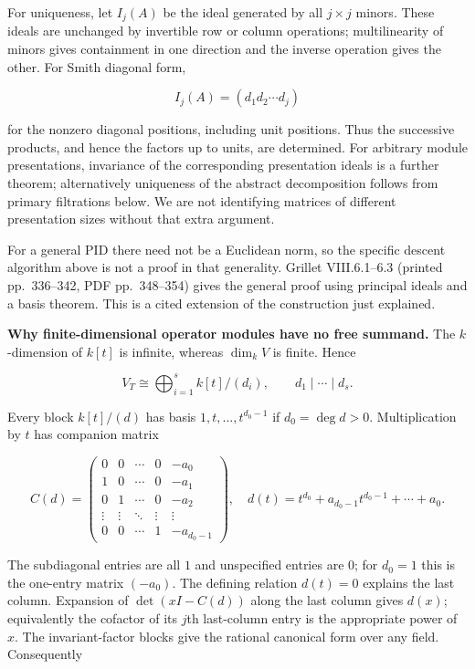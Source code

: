 \documentclass[
  11pt,
]{article}
\begin{document}
For uniqueness, let \(I_j(A)\) be the ideal generated by all
\(j\times j\) minors. These ideals are unchanged by invertible row or
column operations; multilinearity of minors gives containment in one
direction and the inverse operation gives the other. For Smith diagonal
form,

\[I_j(A)=(d_1d_2\cdots d_j)\]

for the nonzero diagonal positions, including unit positions. Thus the
successive products, and hence the factors up to units, are determined.
For arbitrary module presentations, invariance of the corresponding
presentation ideals is a further theorem; alternatively uniqueness of
the abstract decomposition follows from primary filtrations below. We
are not identifying matrices of different presentation sizes without
that extra argument.

For a general PID there need not be a Euclidean norm, so the specific
descent algorithm above is not a proof in that generality. Grillet
VIII.6.1--6.3 (printed pp.~336--342, PDF pp.~348--354) gives the general
proof using principal ideals and a basis theorem. This is a cited
extension of the construction just explained.

\textbf{Why finite-dimensional operator modules have no free summand.}
The \(k\)-dimension of \(k[t]\) is infinite, whereas \(\dim_k V\) is
finite. Hence

\[V_T\cong\bigoplus_{i=1}^s k[t]/(d_i),\qquad d_1\mid\cdots\mid d_s.\]

Every block \(k[t]/(d)\) has basis \(1,t,\ldots,t^{d_0-1}\) if
\(d_0=\deg d>0\). Multiplication by \(t\) has companion matrix

\[C(d)=\begin{pmatrix}
0&0&\cdots&0&-a_0\\
1&0&\cdots&0&-a_1\\
0&1&\cdots&0&-a_2\\
\vdots&\vdots&\ddots&\vdots&\vdots\\
0&0&\cdots&1&-a_{d_0-1}
\end{pmatrix},\quad
d(t)=t^{d_0}+a_{d_0-1}t^{d_0-1}+\cdots+a_0.
\]

The subdiagonal entries are all \(1\) and unspecified entries are \(0\);
for \(d_0=1\) this is the one-entry matrix \((-a_0)\). The defining
relation \(d(t)=0\) explains the last column. Expansion of
\(\det(xI-C(d))\) along the last column gives \(d(x)\); equivalently the
cofactor of its \(j\)th last-column entry is the appropriate power of
\(x\). The invariant-factor blocks give the rational canonical form over
any field. Consequently
\end{document}
